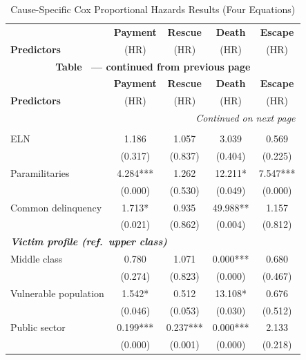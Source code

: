 {\footnotesize
\renewcommand{\arraystretch}{1.05}
\begin{longtable}{lcccc}
\caption{Cause-Specific Cox Proportional Hazards Results (Four Equations)}
\label{tab:cox-full} \\
\toprule
& \textbf{Payment} & \textbf{Rescue} & \textbf{Death} & \textbf{Escape} \\
\textbf{Predictors} & (HR) & (HR) & (HR) & (HR) \\
\midrule
\endfirsthead
\multicolumn{5}{c}{\textbf{Table~\thetable{} --- continued from previous page}} \\
\toprule
& \textbf{Payment} & \textbf{Rescue} & \textbf{Death} & \textbf{Escape} \\
\textbf{Predictors} & (HR) & (HR) & (HR) & (HR) \\
\midrule
\endhead
\midrule
\multicolumn{5}{r}{\textit{Continued on next page}} \\
\bottomrule
\endfoot
\bottomrule
\endlastfoot

\multicolumn{5}{l}{\textbf{\textit{Perpetrator group (ref.\ FARC)}}} \\
ELN & 1.186 & 1.057 & 3.039 & 0.569 \\
    & {\scriptsize (0.317)} & {\scriptsize (0.837)} & {\scriptsize (0.404)} & {\scriptsize (0.225)} \\
Paramilitaries & 4.284*** & 1.262 & 12.211* & 7.547*** \\
               & {\scriptsize (0.000)} & {\scriptsize (0.530)} & {\scriptsize (0.049)} & {\scriptsize (0.000)} \\
Common delinquency & 1.713* & 0.935 & 49.988** & 1.157 \\
                   & {\scriptsize (0.021)} & {\scriptsize (0.862)} & {\scriptsize (0.004)} & {\scriptsize (0.812)} \\
\midrule

\multicolumn{5}{l}{\textbf{\textit{Victim profile (ref.\ upper class)}}} \\
Middle class & 0.780 & 1.071 & 0.000*** & 0.680 \\
             & {\scriptsize (0.274)} & {\scriptsize (0.823)} & {\scriptsize (0.000)} & {\scriptsize (0.467)} \\
Vulnerable population & 1.542* & 0.512 & 13.108* & 0.676 \\
                      & {\scriptsize (0.046)} & {\scriptsize (0.053)} & {\scriptsize (0.030)} & {\scriptsize (0.512)} \\
Public sector & 0.199*** & 0.237*** & 0.000*** & 2.133 \\
              & {\scriptsize (0.000)} & {\scriptsize (0.001)} & {\scriptsize (0.000)} & {\scriptsize (0.218)} \\
\midrule


\end{longtable}}

